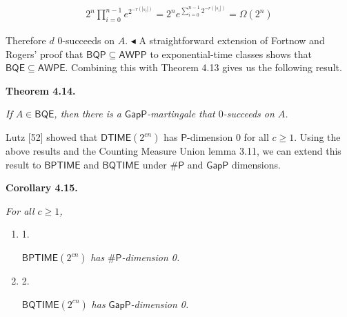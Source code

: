 \documentclass[10pt,a4paper]{article}
\begin{document}
\[\begin{gathered}
2^{n}\prod_{i=0}^{n-1}e^{2^{-r(|s_{i}|)}}=2^{n}e^{\sum\limits_{i=0}^{n-1}2^{-r(|s_{i}|)}}=\Omega(2^{n})
\end{gathered}\]


Therefore $d$ $0$-succeeds on $A$.
$\blacktriangleleft$
A straightforward extension of Fortnow and Rogers’ proof that $\mathsf{BQP}\subseteq\mathsf{AWPP}$ to exponential-time classes shows that
$\mathsf{BQE}\subseteq\mathsf{AWPE}$.
Combining this with Theorem 4.13 gives us the following result.\par





\par\medskip\noindent\textbf{
\textbf{Theorem 4.14}\textbf{.}
}\par



\emph{If $A\in\mathsf{BQE}$, then there is a $\mathsf{GapP}$-martingale that $0$-succeeds on $A$.}\par






Lutz [52] showed that $\mathsf{DTIME}(2^{cn})$ has $\mathsf{P}$-dimension 0 for all $c\geq 1$.
Using the above results and the Counting Measure Union lemma 3.11, we can extend this result to $\mathsf{BPTIME}$ and $\mathsf{BQTIME}$ under ${\mathsf{\#}\mathsf{P}}$ and $\mathsf{GapP}$ dimensions.\par





\par\medskip\noindent\textbf{
\textbf{Corollary 4.15}\textbf{.}
}\par



\emph{For all $c\geq 1$,}\par


\begin{enumerate}


\item[] 
1. 


$\mathsf{BPTIME}(2^{cn})$\emph{ has }${\mathsf{\#}\mathsf{P}}$\emph{-dimension 0.}\par





\item[] 
2. 


$\mathsf{BQTIME}(2^{cn})$\emph{ has }$\mathsf{GapP}$\emph{-dimension 0.}\par





\end{enumerate}
\end{document}
